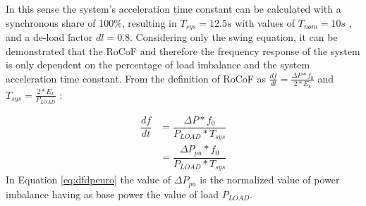 In this sense the system's acceleration time constant can be calculated with a synchronous share of 100\%, resulting in $ T_{sys}=12.5s $   with values of $ T_{nom}=10s $  \cite{ENTSOE.2016, Anderson.2002}, and a de-load factor $ dl=0.8 $. Considering only the swing equation, it can be demonstrated that the RoCoF and therefore the frequency response of the system is only dependent on the percentage of load imbalance and the system acceleration time constant.
From the definition of RoCoF as $ \frac{df}{dt}=\frac{\Delta P*f_0}{2*E_k} $ and  $ T_{sys}=\frac{2*E_k}{P_{LOAD}} $ :

\begin{align}
	\dfrac{df}{dt} &=\dfrac{\Delta P*f_0}{P_{LOAD}*T_{sys}} \nonumber\\
	&=\dfrac{\Delta P_{pu}*f_0}{P_{LOAD}*T_{sys}}
	\label{eq:dfdpeuro}
\end{align}
In Equation \eqref{eq:dfdpeuro} the value of $ \Delta P_{pu} $ is the normalized value of power imbalance having as base power the value of load $ P_{LOAD} $. 
